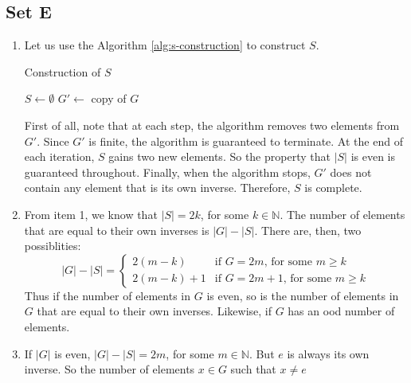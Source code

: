 \subsection{Set E}
\begin{enumerate}
    \item Let us use the Algorithm \ref{alg:s-construction} to construct $S$.
        \begin{algorithm}[H]
            \caption{Construction of $S$}\label{alg:s-construction}
            \begin{algorithmic}[1]
                \Procedure{}{}
                \State $S \leftarrow \emptyset$
                \State $G' \leftarrow$ copy of $G$
                \EndWhile
                \EndProcedure
            \end{algorithmic}
        \end{algorithm}
        First of all, note that at each step, the algorithm removes two elements from $G'$. Since $G'$ is finite, the algorithm is guaranteed to terminate.
        At the end of each iteration, $S$ gains two new elements. So the property that $|S|$ is even is guaranteed throughout. Finally, when the algorithm stops,
        $G'$ does not contain any element that is its own inverse. Therefore, $S$ is complete.
    \item From item 1, we know that $|S| = 2k$, for some $k \in \mathbb{N}$. The number of elements that are equal to their own inverses is $|G| - |S|$. There are, then,
        two possiblities:
        \begin{equation*}
            |G| - |S| =
            \begin{cases}
                2(m - k)     & \text{if $G = 2m$, for some $m \geqslant k$}\\ 
                2(m - k) + 1 & \text{if $G = 2m + 1$, for some $m \geqslant k$}
            \end{cases}
        \end{equation*}
        Thus if the number of elements in $G$ is even, so is the number of elements in $G$ that are equal to their own inverses. Likewise, if $G$ has an ood number of elements.
    \item If $|G|$ is even, $|G| - |S| = 2m$, for some $m \in \mathbb{N}$. But $e$ is always its own inverse. So the number of elements $x \in G$ such that $x \ne e$

\end{enumerate}
